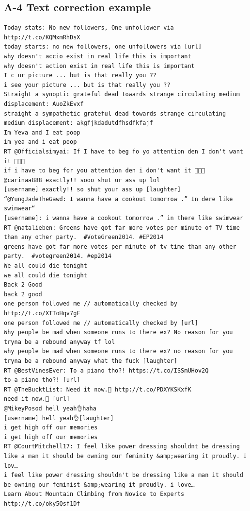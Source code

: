 \documentclass[twocolumn,10pt]{article}
\begin{document}
\subsection*{A-4 Text correction example}
\begin{lstlisting}
Today stats: No new followers, One unfollower via http://t.co/KQMxmRhDsX
today starts: no new followers, one unfollowers via [url]
why doesn't accio exist in real life this is important
why doesn't action exist in real life this is important
I c ur picture ... but is that really you ??
i see your picture ... but is that really you ??
Straight a synoptic grateful dead towards strange circulating medium displacement: AuoZkEvxf
straight a sympathetic grateful dead towards strange circulating medium displacement: akgfjkdadutdfhsdfkfajf
Im Yeva and I eat poop
im yea and i eat poop
RT @Officialsimyai: If I have to beg fo yo attention den I don't want it 👋🙅💁
if i have to beg for you attention den i don't want it 👋🙅💁
@carinaa888 exactly!! sooo shut ur ass up lol
[username] exactly!! so shut your ass up [laughter]
“@YungJadeTheGawd: I wanna have a cookout tomorrow .” In dere like swimwear“
[username]: i wanna have a cookout tomorrow .” in there like swimwear
RT @natalieben: Greens have got far more votes per minute of TV time than any other party.  #VoteGreen2014. #EP2014
greens have got far more votes per minute of tv time than any other party.  #votegreen2014. #ep2014
We all could die tonight
we all could die tonight
Back 2 Good
back 2 good
one person followed me // automatically checked by http://t.co/XTToHqv7gF
one person followed me // automatically checked by [url]
Why people be mad when someone runs to there ex? No reason for you tryna be a rebound anyway tf lol
why people be mad when someone runs to there ex? no reason for you tryna be a rebound anyway what the fuck [laughter]
RT @BestVinesEver: To a piano tho?! https://t.co/ISSmUHov2Q
to a piano tho?! [url]
RT @TheBucktList: Need it now.🌴 http://t.co/PDXYKSKxfK
need it now.🌴 [url]
@MikeyPosod hell yeah👌haha
[username] hell yeah👌[laughter]
i get high off our memories
i get high off our memories
RT @CourtMitchell17: I feel like power dressing shouldnt be dressing like a man it should be owning our feminity &amp;wearing it proudly. I lov…
i feel like power dressing shouldn't be dressing like a man it should be owning our feminist &amp;wearing it proudly. i love…
Learn About Mountain Climbing from Novice to Experts  http://t.co/oky5Qsf1Df

\end{lstlisting}
\end{document}
